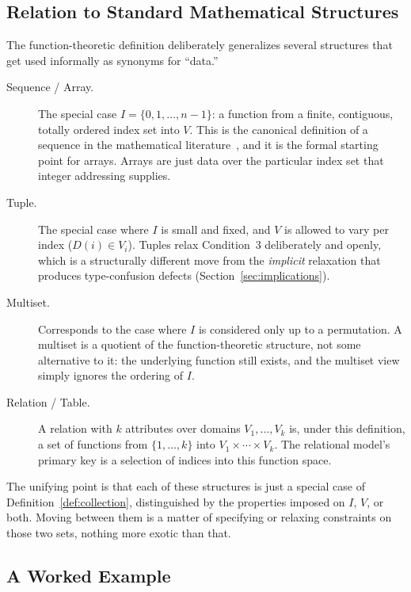 \subsection{Relation to Standard Mathematical Structures}

The function-theoretic definition deliberately generalizes several structures
that get used informally as synonyms for ``data.''

\begin{description}
  \item[Sequence / Array.] The special case $I = \{0, 1, \dots, n-1\}$: a
        function from a finite, contiguous, totally ordered index set into
        $V$. This is the canonical definition of a sequence in the
        mathematical literature~\autocite{knuth1997}, and it is the formal
        starting point for arrays. Arrays are just data over the particular
        index set that integer addressing supplies.
  \item[Tuple.] The special case where $I$ is small and fixed, and $V$ is
        allowed to vary per index ($D(i) \in V_i$). Tuples relax Condition~3
        deliberately and openly, which is a structurally different move from
        the \emph{implicit} relaxation that produces type-confusion defects
        (Section~\ref{sec:implications}).
  \item[Multiset.] Corresponds to the case where $I$ is considered only up to
        a permutation. A multiset is a quotient of the function-theoretic
        structure, not some alternative to it: the underlying function still
        exists, and the multiset view simply ignores the ordering of $I$.
  \item[Relation / Table.] A relation with $k$ attributes over domains
        $V_1, \dots, V_k$ is, under this definition, a set of functions from
        $\{1,\dots,k\}$ into $V_1 \times \cdots \times V_k$. The relational
        model's primary key is a selection of indices into this function
        space.
\end{description}

The unifying point is that each of these structures is just a special case of
Definition~\ref{def:collection}, distinguished by the properties imposed on
$I$, $V$, or both. Moving between them is a matter of specifying or relaxing
constraints on those two sets, nothing more exotic than that.

\subsection{A Worked Example}

